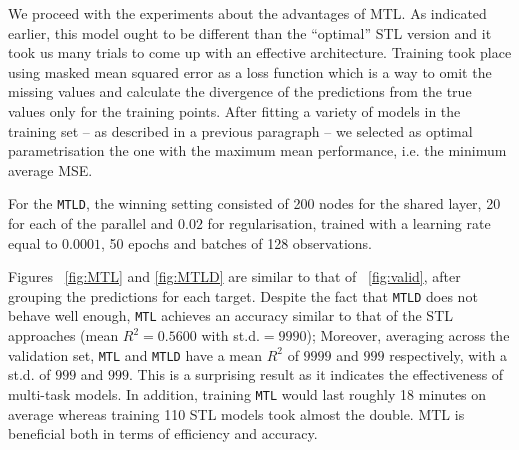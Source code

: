 \documentclass[10pt]{article}
\begin{document}
We proceed with the experiments about the advantages of MTL. As indicated earlier, this model ought to be different than the ``optimal'' STL version and it took us many trials to come up with an effective architecture. Training took place using masked mean squared error as a loss function which is a way to omit the missing values and calculate the divergence of the predictions from the true values only for the training points. After fitting a variety of models in the training set -- as described in a previous paragraph -- we selected as optimal parametrisation the one with the maximum mean performance, i.e. the minimum average MSE. 

For the \texttt{MTLD}, the winning setting consisted of 200 nodes for the shared layer, 20 for each of the parallel and $0.02$ for regularisation, trained with a learning rate equal to $0.0001$, 50 epochs and batches of 128 observations. 

Figures ~\ref{fig:MTL} and \ref{fig:MTLD} are similar to that of ~\ref{fig:valid}, after grouping the predictions for each target. Despite the fact that \texttt{MTLD} does not behave well enough, \texttt{MTL} achieves an accuracy similar to that of the STL approaches (mean $R^2 = 0.5600$ with st.d.$=9990$); Moreover, averaging across the validation set, \texttt{MTL} and \texttt{MTLD} have a mean $R^2$ of $9999$ and $999$ respectively, with a st.d. of $999$ and $999$. This is a surprising result as it indicates the effectiveness of multi-task models. In addition, training \texttt{MTL} would last roughly 18 minutes on average whereas training 110 STL models took almost the double. MTL is beneficial both in terms of efficiency and accuracy. 
\end{document}
